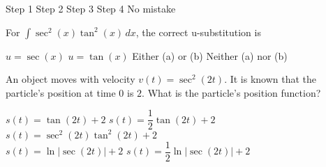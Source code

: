 \begin{questions}
    \begin{oneparchoices}
        \choice Step 1
        \choice Step 2
        \choice Step 3
        \choice Step 4
        \choice No mistake
    \end{oneparchoices} \par \horizontalline

    \question For $\int \sec^2 (x)\tan^2 (x) \, dx$, the correct u-substitution is \\

    \begin{oneparchoices}
        \choice $u = \sec (x)$ 
        \choice $u = \tan (x)$
        \choice Either (a) or (b)
        \choice Neither (a) nor (b)
    \end{oneparchoices} \par \horizontalline

    \question An object moves with velocity $v(t) = \sec^2 (2t)$. It is known that the particle's position at time $0$ is $2$. What is the particle's position function? \\

    \begin{oneparchoices}
        \choice $s(t) = \tan (2t) + 2$
        \choice $s(t) = \dfrac{1}{2}\tan (2t) + 2$
        \choice $s(t) = \sec^2 (2t)\tan^2 (2t) + 2$ \\[11pt]
        \makebox[0.18\textwidth] \choice $s(t) = \ln |\sec (2t)| + 2$
        \makebox[0.15\textwidth] \choice $s(t) = \dfrac{1}{2} \ln |\sec (2t)| + 2$
    \end{oneparchoices} \par \horizontalline
\end{questions}

\newpage
{}

